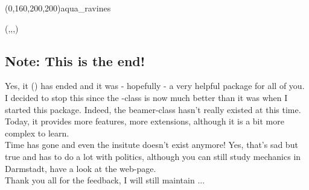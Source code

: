 \documentclass[a4paper,KOMA,landscape]{powersem}
\newcommand{\ifmslide}{{\code{ifmslide.sty}}}
\begin{document}
\address{\href{mailto:thomas@family-emmel.de}%
  {thomas@family-emmel.de}}
\paneltile[on](0,160,200,200){aqua_ravines}
\begin{slide}
  \maketitle
\end{slide}
\paneltile[off](,,,){}
\hidebackground
\pageTransitionReplace
\centerslidesfalse
\begin{slide}
  \section{Note: This is the end!}
  Yes, it (\ifmslide{}) has ended and it was - hopefully - a very 
  helpful package for all of you. I decided to stop this since the 
  -class is now much better than it was when I started this
  package. Indeed, the beamer-class hasn't really existed at this time.
  Today, it provides more features, more extensions, although it is a bit
  more complex to learn.\\[2ex]

  Time has gone and even the insitute doesn't exist anymore! Yes, that's sad 
  but true and has to do a lot with politics, although you can still study
  mechanics in Darmstadt, have a look at the web-page.\\[3ex]


  
  Thank you all for the feedback, I will still maintain ... 
\end{slide}
\end{document}
